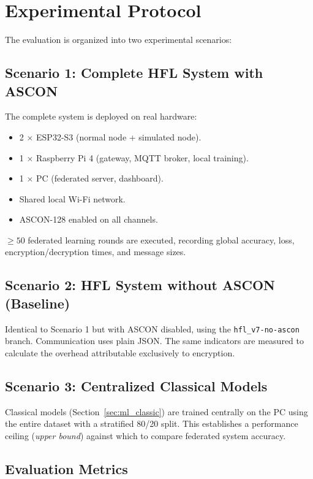 \section{Experimental Protocol}
\label{sec:protocolo}

The evaluation is organized into two experimental scenarios:

\subsection{Scenario 1: Complete HFL System with ASCON}

The complete system is deployed on real hardware:
\begin{itemize}
    \item 2 $\times$ ESP32-S3 (normal node + simulated node).
    \item 1 $\times$ Raspberry Pi 4 (gateway, MQTT broker, local training).
    \item 1 $\times$ PC (federated server, dashboard).
    \item Shared local Wi-Fi network.
    \item ASCON-128 enabled on all channels.
\end{itemize}

$\geq 50$ federated learning rounds are executed, recording global accuracy, loss, encryption/decryption times, and message sizes.

\subsection{Scenario 2: HFL System without ASCON (Baseline)}

Identical to Scenario 1 but with ASCON disabled, using the \texttt{hfl\_v7-no-ascon} branch. Communication uses plain JSON. The same indicators are measured to calculate the overhead attributable exclusively to encryption.

\subsection{Scenario 3: Centralized Classical Models}

Classical models (Section~\ref{sec:ml_classic}) are trained centrally on the PC using the entire dataset with a stratified 80/20 split. This establishes a performance ceiling (\emph{upper bound}) against which to compare federated system accuracy.

\subsection{Evaluation Metrics}

